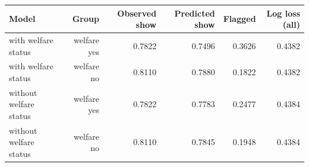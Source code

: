 \begin{tabular}{lrrrrr}
\toprule
Model & Group & Observed show & Predicted show & Flagged & Log loss (all) \\
\midrule
with welfare status & welfare yes & 0.7822 & 0.7496 & 0.3626 & 0.4382 \\
with welfare status & welfare no & 0.8110 & 0.7880 & 0.1822 & 0.4382 \\
without welfare status & welfare yes & 0.7822 & 0.7783 & 0.2477 & 0.4384 \\
without welfare status & welfare no & 0.8110 & 0.7845 & 0.1948 & 0.4384 \\
\bottomrule
\end{tabular}
